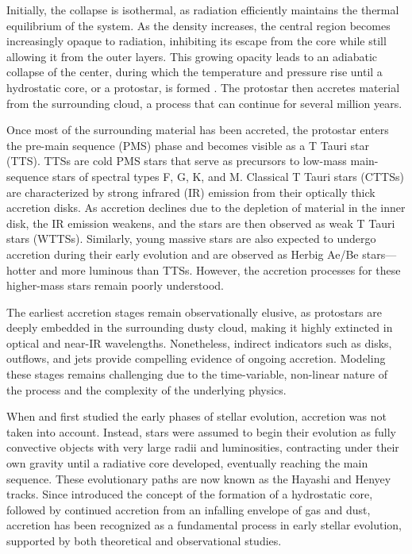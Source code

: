 \documentclass[12pt,a4paper]{article}
\begin{document}
Initially, the collapse is isothermal, as radiation efficiently maintains the thermal equilibrium of the system. As the density increases, the central region becomes increasingly opaque to radiation, inhibiting its escape from the core while still allowing it from the outer layers. This growing opacity leads to an adiabatic collapse of the center, during which the temperature and pressure rise until a hydrostatic core, or a protostar, is formed \parencite[e.g., ][]{StahlerPalla2004}. The protostar then accretes material from the surrounding cloud, a process that can continue for several million years.

Once most of the surrounding material has been accreted, the protostar enters the pre-main sequence (PMS) phase and becomes visible as a T Tauri star (TTS). TTSs are cold PMS stars that serve as precursors to low-mass main-sequence stars of spectral types F, G, K, and M. Classical T Tauri stars (CTTSs) are characterized by strong infrared (IR) emission from their optically thick accretion disks. As accretion declines due to the depletion of material in the inner disk, the IR emission weakens, and the stars are then observed as weak T Tauri stars (WTTSs). Similarly, young massive stars are also expected to undergo accretion during their early evolution and are observed as Herbig Ae/Be stars—hotter and more luminous than TTSs. However, the accretion processes for these higher-mass stars remain poorly understood.

The earliest accretion stages remain observationally elusive, as protostars are deeply embedded in the surrounding dusty cloud, making it highly extincted in optical and near-IR wavelengths. Nonetheless, indirect indicators such as disks, outflows, and jets provide compelling evidence of ongoing accretion. Modeling these stages remains challenging due to the time-variable, non-linear nature of the process and the complexity of the underlying physics.

When \textcite{HenyeyEtAl1955} and \textcite{Hayashi1961} first studied the early phases of stellar evolution, accretion was not taken into account. Instead, stars were assumed to begin their evolution as fully convective objects with very large radii and luminosities, contracting under their own gravity until a radiative core developed, eventually reaching the main sequence. These evolutionary paths are now known as the Hayashi and Henyey tracks. Since \textcite{Larson1969} introduced the concept of the formation of a hydrostatic core, followed by continued accretion from an infalling envelope of gas and dust, accretion has been recognized as a fundamental process in early stellar evolution, supported by both theoretical and observational studies.
\end{document}

